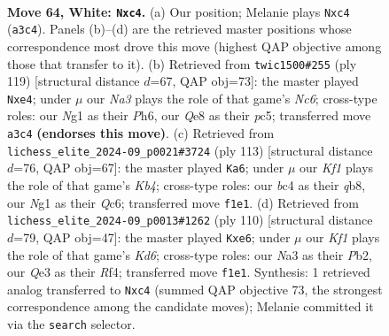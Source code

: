 \documentclass[11pt]{article}
\begin{document}
\clearpage

\begin{figure}[p]\centering
\begin{subfigure}{0.46\textwidth}\centering
\resizebox{\linewidth}{!}{%
\newchessgame
\chessboard[
  setfen={4Q3/8/p4k2/3P3p/2b3p1/N3Q3/5P1q/5KN1 w - - 1 64},
  showmover=false,
  pgfstyle=straightmove, color=movearrow, markmove={a3-c4}
]}
\caption{}
\end{subfigure}\hfill
\begin{subfigure}{0.46\textwidth}\centering
\resizebox{\linewidth}{!}{%
\newchessgame
\chessboard[
  setfen={4Q3/6qk/7p/2P5/3PBP2/1pn4P/3r4/7K b - - 5 60},
  showmover=false,
  pgfstyle=straightmove, color=movearrow, markmove={c3-e4}
]}
\caption{}
\end{subfigure}
\\[4pt]
\begin{subfigure}{0.46\textwidth}\centering
\resizebox{\linewidth}{!}{%
\newchessgame
\chessboard[
  setfen={1Q6/7p/2q3p1/pk3p2/5P2/3np2P/6PK/4B3 b - - 5 57},
  showmover=false,
  pgfstyle=straightmove, color=movearrow, markmove={b5-a6}
]}
\caption{}
\end{subfigure}\hfill
\begin{subfigure}{0.46\textwidth}\centering
\resizebox{\linewidth}{!}{%
\newchessgame
\chessboard[
  setfen={3q4/kp6/p1bKp3/4Q3/5R2/P7/1P6/8 w - - 12 56},
  showmover=false,
  pgfstyle=straightmove, color=movearrow, markmove={d6-e6}
]}
\caption{}
\end{subfigure}
\caption{\textbf{Move 64, White: \texttt{Nxc4}.} (a) Our position; Melanie plays \texttt{Nxc4} (\texttt{a3c4}). Panels (b)--(d) are the retrieved master positions whose correspondence most drove this move (highest QAP objective among those that transfer to it). (b) Retrieved from \texttt{twic1500\#255} (ply 119) [structural distance $d$=67, QAP obj=73]: the master played \texttt{Nxe4}; under $\mu$ our \emph{Na3} plays the role of that game's \emph{Nc6}; cross-type roles: our \emph{N}g1 as their \emph{P}h6, our \emph{Q}e8 as their \emph{p}c5; transferred move \texttt{a3c4} \textbf{(endorses this move)}. (c) Retrieved from \texttt{lichess\_elite\_2024-09\_p0021\#3724} (ply 113) [structural distance $d$=76, QAP obj=67]: the master played \texttt{Ka6}; under $\mu$ our \emph{Kf1} plays the role of that game's \emph{Kb4}; cross-type roles: our \emph{b}c4 as their \emph{q}b8, our \emph{N}g1 as their \emph{Q}c6; transferred move \texttt{f1e1}. (d) Retrieved from \texttt{lichess\_elite\_2024-09\_p0013\#1262} (ply 110) [structural distance $d$=79, QAP obj=47]: the master played \texttt{Kxe6}; under $\mu$ our \emph{Kf1} plays the role of that game's \emph{Kd6}; cross-type roles: our \emph{N}a3 as their \emph{P}b2, our \emph{Q}e3 as their \emph{R}f4; transferred move \texttt{f1e1}. Synthesis: 1 retrieved analog transferred to \texttt{Nxc4} (summed QAP objective 73, the strongest correspondence among the candidate moves); Melanie committed it via the \texttt{search} selector.}
\label{fig:thought-m126}
\end{figure}
\end{document}
